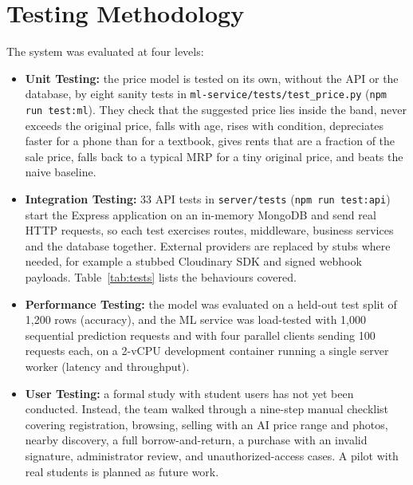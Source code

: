 \documentclass[12pt,letterpaper,twoside,openany]{report}
\newcommand{\code}[1]{\texttt{#1}}
\begin{document}
\section{Testing Methodology}
The system was evaluated at four levels:
\begin{itemize}
  \item \textbf{Unit Testing:} the price model is tested on its own, without the API or the database, by
        eight sanity tests in \code{ml-service/tests/test\_price.py} (\code{npm run test:ml}). They check
        that the suggested price lies inside the band, never exceeds the original price, falls with age,
        rises with condition, depreciates faster for a phone than for a textbook, gives rents that are a
        fraction of the sale price, falls back to a typical MRP for a tiny original price, and beats the
        naive baseline.
  \item \textbf{Integration Testing:} 33 API tests in \code{server/tests} (\code{npm run test:api}) start
        the Express application on an in-memory MongoDB and send real HTTP requests, so each test exercises
        routes, middleware, business services and the database together. External providers are replaced
        by stubs where needed, for example a stubbed Cloudinary SDK and signed webhook payloads.
        Table~\ref{tab:tests} lists the behaviours covered.
  \item \textbf{Performance Testing:} the model was evaluated on a held-out test split of 1{,}200 rows
        (accuracy), and the ML service was load-tested with 1{,}000 sequential prediction requests and with
        four parallel clients sending 100 requests each, on a 2-vCPU development container running a single
        server worker (latency and throughput).
  \item \textbf{User Testing:} a formal study with student users has not yet been conducted. Instead, the
        team walked through a nine-step manual checklist covering registration, browsing, selling with an AI
        price range and photos, nearby discovery, a full borrow-and-return, a purchase with an invalid
        signature, administrator review, and unauthorized-access cases. A pilot with real students is
        planned as future work.
\end{itemize}
\end{document}
